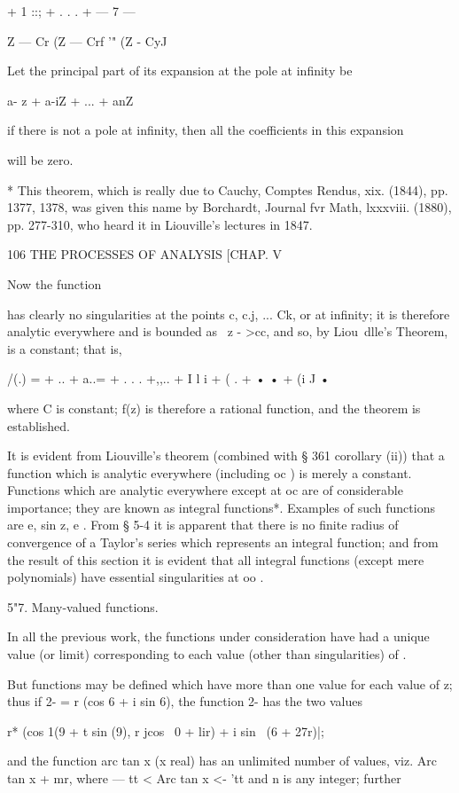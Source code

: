 {{{{+ 1 ::; + . . . + — 7 —

Z — Cr (Z — Crf '" (Z - CyJ

Let the principal part of its expansion at the pole at infinity be

a- z + a-iZ + ... + anZ \

if there is not a pole at infinity, then all the coefficients in this
expansion

will be zero.

* This theorem, which is really due to Cauchy, Comptes Rendus, xix.
(1844), pp. 1377, 1378, was given this name by Borchardt, Journal fvr
Math, lxxxviii. (1880), pp. 277-310, who heard it in Liouville's
lectures in 1847.

106 THE PROCESSES OF ANALYSIS [CHAP. V

Now the function

has clearly no singularities at the points c, c.j, ... Ck, or at
infinity; it is therefore analytic everywhere and is bounded as \ z -
>cc, and so, by Liou\ dlle's Theorem, is a constant; that is,

/(.) = + .. + a..= + . . . +,,.. + I l i + ( . + • • + (i J •

where C is constant; f(z) is therefore a rational function, and the
theorem is established.

It is evident from Liouville's theorem (combined with § 361 corollary
(ii)) that a function which is analytic everywhere (including oc ) is
merely a constant. Functions which are analytic everywhere except at
oc are of considerable importance; they are known as integral
functions*. Examples of such functions are e, sin z, e . From § 5-4
it is apparent that there is no finite radius of convergence of a
Taylor's series which represents an integral function; and from the
result of this section it is evident that all integral functions
(except mere polynomials) have essential singularities at oo .

5"7. Many-valued functions.

In all the previous work, the functions under consideration have had a
unique value (or limit) corresponding to each value (other than
singularities) of .

But functions may be defined which have more than one value for each
value of z; thus if 2- = r (cos 6 + i sin 6), the function 2- has the
two values

r* (cos 1(9 + t sin (9), r jcos \ 0 + lir) + i sin \ (6 + 27r)|;

and the function arc tan x (x real) has an unlimited number of values,
viz. Arc tan x + mr, where — tt < Arc tan x <- 'tt and n is any
integer; further

}}}}

